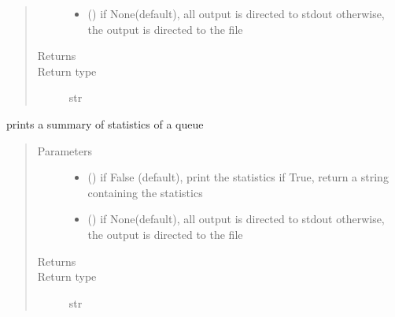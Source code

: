 \documentclass[letterpaper,10pt,english]{sphinxmanual}
\begin{document}
\begin{fulllineitems}
\begin{fulllineitems}
\begin{quote}
\begin{description}
\begin{itemize}
\item {} 
 () \textendash{} if None(default), all output is directed to stdout 
otherwise, the output is directed to the file

\end{itemize}

\item[{Returns}] \leavevmode
{}

\item[{Return type}] \leavevmode
str

\end{description}\end{quote}

\end{fulllineitems}


\begin{fulllineitems}
\label{\detokenize{Reference:salabim.Queue.print_statistics}}
prints a summary of statistics of a queue
\begin{quote}\begin{description}
\item[{Parameters}] \leavevmode\begin{itemize}
\item {} 
 () \textendash{} if False (default), print the statistics
if True, return a string containing the statistics

\item {} 
 () \textendash{} if None(default), all output is directed to stdout 
otherwise, the output is directed to the file

\end{itemize}

\item[{Returns}] \leavevmode
{}

\item[{Return type}] \leavevmode
str

\end{description}\end{quote}

\end{fulllineitems}


\end{fulllineitems}
\end{document}
